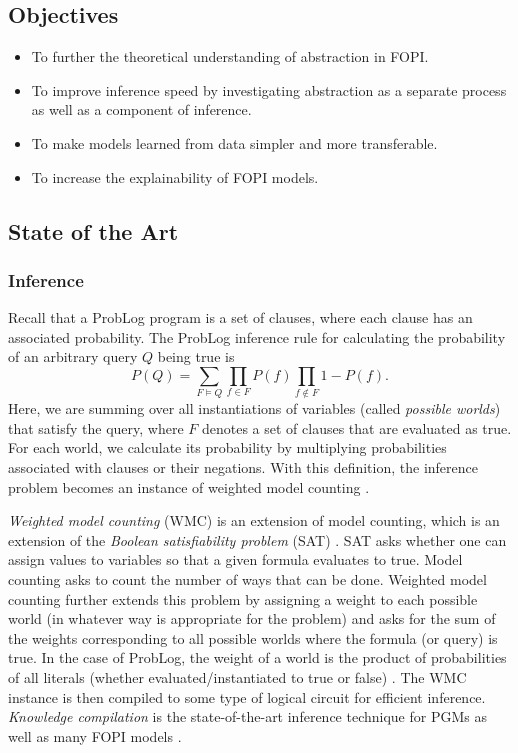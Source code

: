 \documentclass{article}
\begin{document}
\subsection{Objectives}

\begin{itemize}
\item To further the theoretical understanding of abstraction in FOPI.
\item To improve inference speed by investigating abstraction as a separate
  process as well as a component of inference.
\item To make models learned from data simpler and more transferable.
\item To increase the explainability of FOPI models.
\end{itemize}

\subsection{State of the Art}

\subsubsection{Inference}

Recall that a ProbLog program is a set of clauses, where each clause has an
associated probability. The ProbLog inference rule
\cite{DBLP:series/synthesis/2016Raedt,DBLP:conf/iclp/Sato95} for calculating the
probability of an arbitrary query $Q$ being true is
\[
  P(Q) = \sum_{F \models Q} \prod_{f \in F} P(f) \prod_{f \not\in F} 1 -
  P(f).
\]
Here, we are summing over all instantiations of variables (called \emph{possible
worlds}) that satisfy the query, where $F$ denotes a set of clauses that are
evaluated as true. For each world, we calculate its probability by multiplying
probabilities associated with clauses or their negations. With this
definition, the inference problem becomes an instance of weighted model
counting \cite{DBLP:series/synthesis/2016Raedt}.

\emph{Weighted model counting} (WMC) is an extension of model counting, which is
an extension of the \emph{Boolean satisfiability problem} (SAT)
\cite{DBLP:journals/ai/ChaviraD08}. SAT asks whether one can assign values to
variables so that a given formula evaluates to true. Model counting asks to
count the number of ways that can be done. Weighted model counting further
extends this problem by assigning a weight to each possible world (in whatever
way is appropriate for the problem) and asks for the sum of the weights
corresponding to all possible worlds where the formula (or query) is true. In
the case of ProbLog, the weight of a world is the product of probabilities of
all literals (whether evaluated/instantiated to true or false)
\cite{DBLP:series/synthesis/2016Raedt}. The WMC instance is then compiled to
some type of logical circuit for efficient inference. \emph{Knowledge
  compilation} \cite{DBLP:conf/ijcai/BroeckTMDR11} is the state-of-the-art
inference technique for PGMs as well as many FOPI models
\cite{DBLP:series/synthesis/2016Raedt}.
\end{document}
